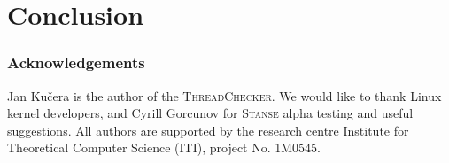 \documentclass[10pt]{llncs}
\newcommand{\Stanse}{\textsc{Stanse}\xspace}
\newcommand{\TC}{\textsc{ThreadChecker}\xspace}
\begin{document}

\section{Conclusion}

%
%
%
%

\subsubsection{Acknowledgements}
\label{sec:acknowledgements}

Jan Ku\v{c}era is the author of the \TC. We would like to thank Linux kernel
developers, and Cyrill Gorcunov for \Stanse alpha testing and useful
suggestions. All authors are supported by the research centre Institute for
Theoretical Computer Science (ITI), project No. 1M0545.




\end{document}
